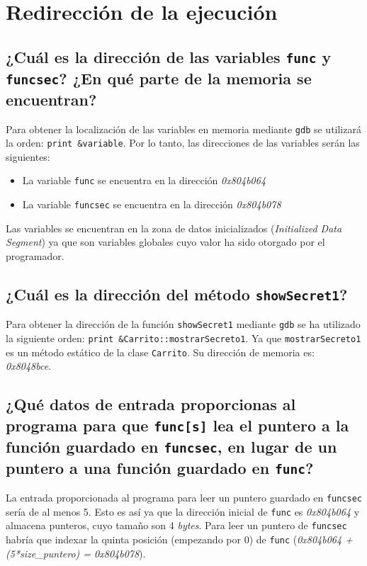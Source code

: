 \documentclass[10pt,a4paper]{article}
\begin{document}
\section{Redirección de la ejecución}

\subsection{¿Cuál es la dirección de las variables \texttt{func} y \texttt{funcsec}? ¿En qué parte de la memoria se encuentran?}

Para obtener la localización de las variables en memoria mediante \texttt{gdb} se utilizará la orden: \texttt{print \&{}variable}. Por lo tanto, las direcciones de las variables serán las siguientes:
\begin{itemize}
\item La variable \texttt{func} se encuentra en la dirección \emph{0x804b064}
\item La variable \texttt{funcsec} se encuentra en la dirección \emph{0x804b078}
\end{itemize}

Las variables se encuentran en la zona de datos inicializados (\emph{Initialized Data Segment}) ya que son variables globales cuyo valor ha sido otorgado por el programador.


\subsection{¿Cuál es la dirección del método \texttt{showSecret1}?}

Para obtener la dirección de la función \texttt{showSecret1} mediante \texttt{gdb} se ha utilizado la siguiente orden: \texttt{print \&{}Carrito::mostrarSecreto1}. Ya que \texttt{mostrarSecreto1} es un método estático de la clase \texttt{Carrito}. Su dirección de memoria es: \emph{0x8048bce}.


\subsection{¿Qué datos de entrada proporcionas al programa para que \texttt{func[s]} lea el puntero a la función guardado en \texttt{funcsec}, en lugar de un puntero a una función guardado en \texttt{func}?}

La entrada proporcionada al programa para leer un puntero guardado en \texttt{funcsec} sería de al menos 5. Esto es así ya que la dirección inicial de \texttt{func} es \emph{0x804b064} y almacena punteros, cuyo tamaño son 4 \emph{bytes}. Para leer un puntero de \texttt{funcsec} habría que indexar la quinta posición (empezando por 0) de \texttt{func} (\emph{0x804b064 + (5*size\_{}puntero) = 0x804b078}).\\
\end{document}
